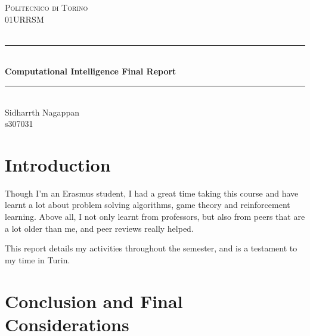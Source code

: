\documentclass[12pt]{article}
\begin{document}
\begin{titlepage}

\newcommand{\HRule}{\rule{\linewidth}{0.5mm}} 							%
\center 
 
\textsc{\LARGE Politecnico di Torino}\\[1cm]

\textsc{\Large 01URRSM}\\[0.2cm]
\textsc{\large }\\[1cm] 										%
\HRule \\[0.8cm]
{ \huge \bfseries Computational Intelligence Final Report}\\[0.7cm]								%
\HRule \\[2cm]
\Large
Sidharrth Nagappan\\[0.5cm] 										%
s307031

\vfill 
\end{titlepage}

\tableofcontents

\newpage


\section{Introduction}

\large

Though I'm an Erasmus student, I had a great time taking this course and have learnt a lot about problem solving algorithms, game theory and reinforcement learning. Above all, I not only learnt from professors, but also from peers that are a lot older than me, and peer reviews really helped.

This report details my activities throughout the semester, and is a testament to my time in Turin.







\section{Conclusion and Final Considerations}
\end{document}
